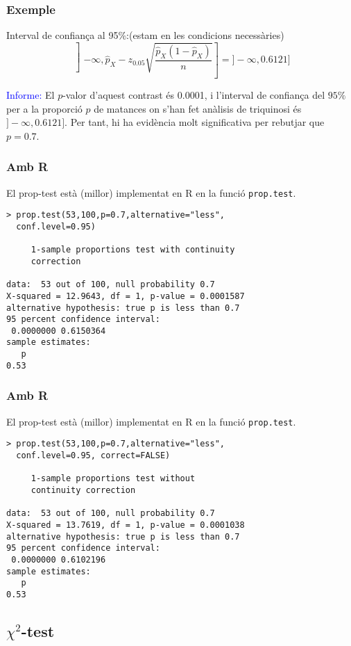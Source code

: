 \documentclass[12pt,t]{beamer}\usepackage[]{graphicx}\usepackage[]{color}
\newcommand{\blue}[1]{\textcolor{blue}{#1}}
\renewcommand{\emph}[1]{{\color{red}#1}}
\theoremstyle{plain}
\theoremstyle{definition}
\begin{document}
\begin{frame}
\frametitle{Exemple}

\emph{Interval de confiança al 95\%}:\pause (estam en les condicions necessàries)
$$
\left]-\infty,\widehat{p}_X-z_{0.05}\sqrt{\frac{\widehat{p}_X(1-\widehat{p}_X)}{n}}\right]=]-\infty,0.6121]
$$
\bigskip

\blue{Informe:} El $p$-valor d'aquest contrast és 0.0001, i l'interval de confiança del $95\%$ per a la proporció $p$ de matances on s'han fet anàlisis de triquinosi és $]-\infty,0.6121]$. Per tant,  hi ha evidència molt significativa per rebutjar  que $p=0.7$.


\end{frame}

\begin{frame}[fragile]
\frametitle{Amb R}

El prop-test està (millor) implementat en R en la funció \texttt{prop.test}. 

{\small
\begin{verbatim}
> prop.test(53,100,p=0.7,alternative="less",
  conf.level=0.95)

     1-sample proportions test with continuity 
     correction

data:  53 out of 100, null probability 0.7
X-squared = 12.9643, df = 1, p-value = 0.0001587
alternative hypothesis: true p is less than 0.7
95 percent confidence interval:
 0.0000000 0.6150364
sample estimates:
   p 
0.53 
\end{verbatim}
}
\end{frame}


\begin{frame}[fragile]
\frametitle{Amb R}

El prop-test està (millor) implementat en R en la funció \texttt{prop.test}. 

{\small
\begin{verbatim}
> prop.test(53,100,p=0.7,alternative="less",
  conf.level=0.95, correct=FALSE)

     1-sample proportions test without 
     continuity correction

data:  53 out of 100, null probability 0.7
X-squared = 13.7619, df = 1, p-value = 0.0001038
alternative hypothesis: true p is less than 0.7
95 percent confidence interval:
 0.0000000 0.6102196
sample estimates:
   p 
0.53 
\end{verbatim}
}
\end{frame}


\subsection{$\chi^2$-test}
\end{document}
